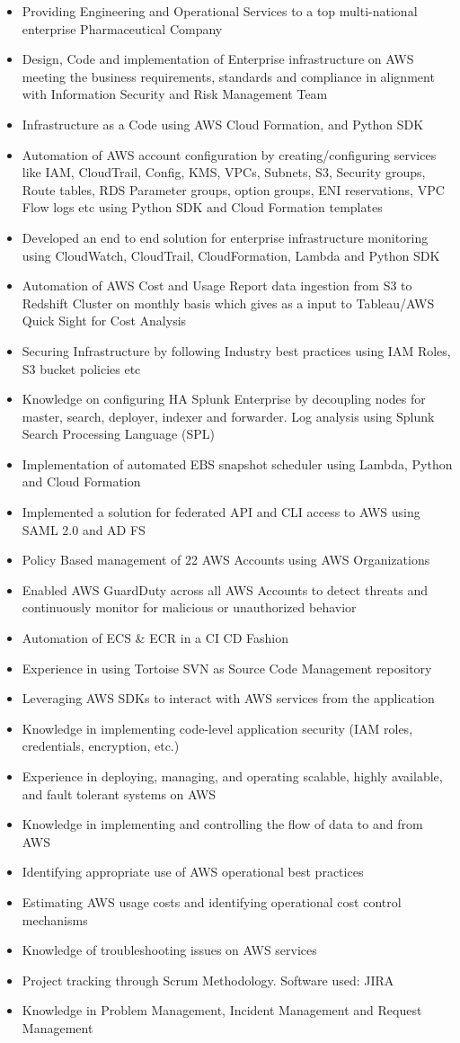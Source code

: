 \documentclass[letterpaper,11pt]{article}
\newcommand{\resumeItem}[2]{
  \item\small{
    \textbf{#1}{#2 \vspace{-2pt}}
  }
}
\newcommand{\resumeItemListStart}{\begin{itemize}}
\newcommand{\resumeItemListEnd}{\end{itemize}\vspace{-5pt}}
\begin{document}
      \resumeItemListStart
        \resumeItem{}{Providing Engineering and Operational Services to a top multi-national enterprise Pharmaceutical Company}
        \resumeItem{}
          {Design, Code and implementation of Enterprise infrastructure on AWS meeting the business requirements, standards and compliance in alignment with Information Security and Risk Management Team}
        \resumeItem{}
          {Infrastructure as a Code using AWS Cloud Formation, and Python SDK}
        \resumeItem{}{Automation of AWS account configuration by creating/configuring services like IAM, CloudTrail, Config, KMS, VPCs, Subnets, S3, Security groups, Route tables, RDS Parameter groups, option groups, ENI reservations, VPC Flow logs etc using Python SDK and Cloud Formation templates}
        \resumeItem{}{Developed an end to end solution for enterprise infrastructure monitoring using CloudWatch, CloudTrail, CloudFormation, Lambda and Python SDK}
        \resumeItem{}{Automation of AWS Cost and Usage Report data ingestion from S3 to Redshift Cluster on monthly basis which gives as a input to Tableau/AWS Quick Sight for Cost Analysis}
        \resumeItem{}{Securing Infrastructure by following Industry best practices using IAM Roles, S3 bucket policies etc}
        \resumeItem{}{Knowledge on configuring HA Splunk Enterprise by decoupling nodes for master, search, deployer, indexer and forwarder. Log analysis using Splunk Search Processing Language (SPL)}
        \resumeItem{}{Implementation of automated EBS snapshot scheduler using Lambda, Python and Cloud Formation}
        \resumeItem{}{Implemented a solution for federated API and CLI access to AWS using SAML 2.0 and AD FS}
        \resumeItem{}{Policy Based management of 22 AWS Accounts using AWS Organizations}
        \resumeItem{}{Enabled AWS GuardDuty across all AWS Accounts to detect threats and continuously monitor for malicious or unauthorized behavior}
        \resumeItem{}{Automation of ECS \& ECR in a CI CD Fashion}
        \resumeItem{}{Experience in using Tortoise SVN as Source Code Management repository}
        \resumeItem{}{Leveraging AWS SDKs to interact with AWS services from the application}
        \resumeItem{}{Knowledge in implementing code-level application security (IAM roles, credentials, encryption, etc.)}
        \resumeItem{}{Experience in deploying, managing, and operating scalable, highly available, and fault tolerant systems on AWS}
        \resumeItem{}{Knowledge in implementing and controlling the flow of data to and from AWS}
        \resumeItem{}{Identifying appropriate use of AWS operational best practices}
        \resumeItem{}{Estimating AWS usage costs and identifying operational cost control mechanisms}
        \resumeItem{}{Knowledge of troubleshooting issues on AWS services}
        \resumeItem{}{Project tracking through Scrum Methodology. Software used: JIRA}
        \resumeItem{}{Knowledge in Problem Management, Incident Management and Request Management}
      \resumeItemListEnd
\end{document}
